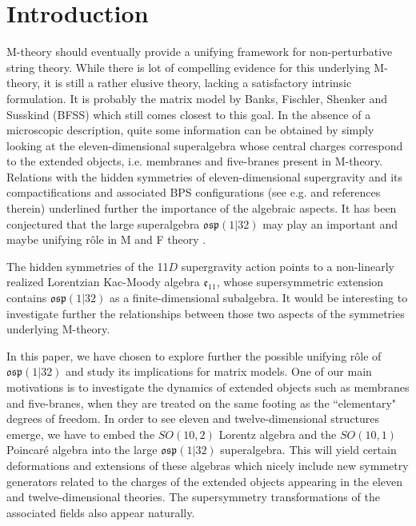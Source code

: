 \documentclass[a4paper,11pt]{article}
\begin{document}
\newpage
{}  
\section{Introduction}
M-theory \cite{Witten} should eventually provide a unifying framework for non-perturbative string theory. 
While there is lot of compelling evidence for this underlying M-theory, it is still a rather elusive theory, 
lacking a satisfactory intrinsic formulation. It is probably the matrix model by Banks, Fischler, Shenker and 
Susskind (BFSS) \cite{BFSS} which still comes closest to this goal.
In the absence of a microscopic description, quite some information can be obtained by simply looking at 
the eleven-dimensional superalgebra \cite{Townsend} whose central charges correspond to the extended objects,
i.e. membranes and five-branes present in M-theory. Relations with the hidden symmetries of eleven-dimensional 
supergravity \cite{CJS} and its compactifications and associated BPS configurations (see e.g. \cite{deWit,West}
and references therein) underlined further the importance of the algebraic aspects. It has been conjectured \cite{BVP} 
that the large superalgebra $\mathfrak{osp}(1|32)$ may play an important and maybe 
unifying r\^ole in M and F theory \cite{Vafa}.

The hidden symmetries of the 11$D$ supergravity action points to a non-linearly realized Lorentzian Kac-Moody algebra
$\mathfrak{e}_{11}$, whose supersymmetric extension contains $\mathfrak{osp}(1|32)$ as a finite-dimensional subalgebra. 
It would be interesting to investigate further the relationships between those two aspects of the symmetries underlying 
M-theory. 

In this paper, we have chosen to explore further the possible unifying r\^ole of $\mathfrak{osp}(1|32)$ and study 
its implications for matrix models. One of our main motivations is to investigate the dynamics of extended objects 
such as membranes and five-branes, when they are treated on the same footing as the ``elementary" degrees of freedom.
In order to see eleven and twelve-dimensional structures emerge, we have to embed the $SO(10,2)$ Lorentz algebra
and the $SO(10,1)$ Poincar\'e algebra into the large $\mathfrak{osp}(1|32)$ superalgebra. This will yield certain 
deformations and extensions of these algebras which nicely include new symmetry generators related to the charges 
of the extended objects appearing in the eleven and twelve-dimensional theories. The supersymmetry transformations 
of the associated fields also appear naturally. 
\end{document}

